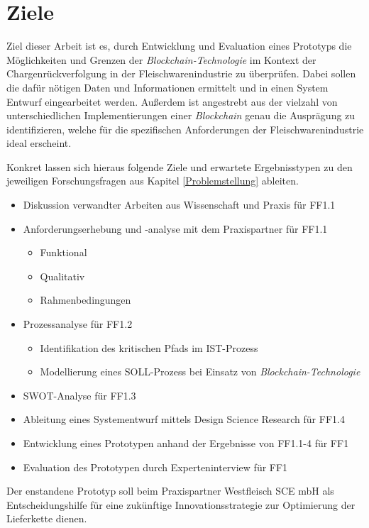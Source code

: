 \section{Ziele}

Ziel dieser Arbeit ist es, durch Entwicklung und Evaluation eines Prototyps die Möglichkeiten und Grenzen der \textit{Blockchain-Technologie} im Kontext der Chargenrückverfolgung in der Fleischwarenindustrie zu überprüfen. Dabei sollen die dafür nötigen Daten und Informationen ermittelt und in einen System Entwurf eingearbeitet werden. Außerdem ist angestrebt aus der vielzahl von unterschiedlichen Implementierungen einer \textit{Blockchain} genau die Ausprägung zu identifizieren, welche für die spezifischen Anforderungen der Fleischwarenindustrie ideal erscheint.

Konkret lassen sich hieraus folgende Ziele und erwartete Ergebnisstypen zu den jeweiligen Forschungsfragen aus Kapitel \ref{Problemstellung} ableiten.

\begin{itemize}
  \item Diskussion verwandter Arbeiten aus Wissenschaft und Praxis für FF1.1
  \item Anforderungserhebung und -analyse mit dem Praxispartner für FF1.1
  \begin{itemize}
    \item Funktional
    \item Qualitativ
    \item Rahmenbedingungen
  \end{itemize}
  \item Prozessanalyse für FF1.2
  \begin{itemize}
    \item Identifikation des \glqq kritischen Pfads\grqq{} im IST-Prozess
    \item Modellierung eines SOLL-Prozess bei Einsatz von \textit{Blockchain-Technologie}
  \end{itemize}
  \item SWOT-Analyse für FF1.3
  \item Ableitung eines Systementwurf mittels Design Science Research für FF1.4
  \item Entwicklung eines Prototypen anhand der Ergebnisse von FF1.1-4 für FF1
  \item Evaluation des Prototypen durch Experteninterview für FF1
\end{itemize}

Der enstandene Prototyp soll beim Praxispartner Westfleisch SCE mbH als Entscheidungshilfe für eine zukünftige Innovationsstrategie zur Optimierung der Lieferkette dienen.

